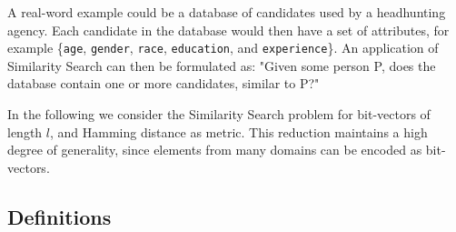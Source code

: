 \documentclass[a4paper,11pt]{article}
\begin{document}
A real-word example could be a database of candidates used by a headhunting agency. Each candidate in the database would then have a set of attributes, for example \{\texttt{age}, \texttt{gender}, \texttt{race}, \texttt{education}, and \texttt{experience}\}.
An application of Similarity Search can then be formulated as: "Given some person P, does the database contain one or more candidates, similar to P?"

In the following we consider the Similarity Search problem for bit-vectors of length $l$, and Hamming distance as metric. This reduction maintains a high degree of generality, since elements from many domains can be encoded as bit-vectors.

\subsection{Definitions}
\end{document}
